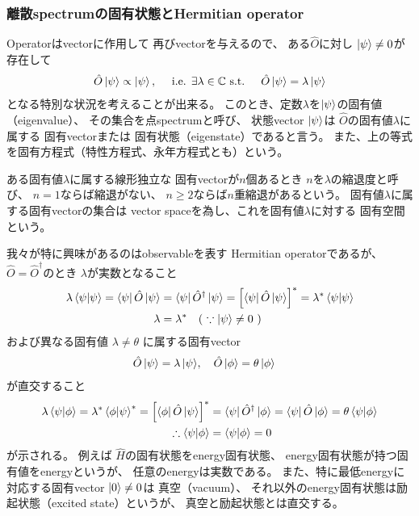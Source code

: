 \subsubsection{離散spectrumの固有状態とHermitian operator}

Operatorはvectorに作用して
再びvectorを与えるので、
ある$\hat{O}$に対し
$\ket{\psi} \neq 0$が存在して
\begin{align}
    \hat{O}\ket{\psi} \propto \ket{\psi}
,\quad\text{
    i.e.
    $\exists \lambda\in\mathbb{C}$
    s.t.
}\quad
    \hat{O}\ket{\psi} = \lambda \ket{\psi}
\end{align}
となる特別な状況を考えることが出来る。
このとき、定数$\lambda$を$\ket{\psi}$の固有値（eigenvalue）、
その集合を点spectrumと呼び、
状態vector $\ket{\psi}$は
$\hat{O}$の固有値$\lambda$に属する
固有vectorまたは
固有状態（eigenstate）であると言う。
また、上の等式を固有方程式（特性方程式、永年方程式とも）という。

ある固有値$\lambda$に属する線形独立な
固有vectorが$n$個あるとき
$n$を$\lambda$の縮退度と呼び、
$n = 1$ならば縮退がない、
$n \ge 2$ならば$n$重縮退があるという。
固有値$\lambda$に属する固有vectorの集合は
vector spaceを為し、これを固有値$\lambda$に対する
固有空間という。

我々が特に興味があるのはobservableを表す
Hermitian operatorであるが、
$\hat{O} = \hat{O}^\dagger$のとき
$\lambda$が実数となること
\begin{align}
    \lambda \braket{\psi | \psi}
    =
    \bra{\psi} \hat{O} \ket{\psi}
    &= \bra{\psi} \hat{O}^\dagger \ket{\psi}
    = \left[ \bra{\psi} \hat{O} \ket{\psi}\right]^*
    = \lambda^* \braket{\psi | \psi}
\notag\\
    \lambda &= \lambda^*
    \quad
    (\ 
        \because
        \ket{\psi} \neq 0
    \ 
    )
\end{align}
および異なる固有値
$\lambda \neq \theta$
に属する固有vector
\begin{align}
    \hat{O} \ket{\psi} = \lambda \ket{\psi}
&,\quad
    \hat{O} \ket{\phi} = \theta \ket{\phi}
\end{align}
が直交すること
\begin{align}
    \lambda
    \braket{\psi|\phi}
    =
    \lambda^*
    \braket{\phi|\psi}^*
    =
    \left[
        \bra{\phi} \hat{O} \ket{\psi}
    \right]^*
    &= \bra{\psi} \hat{O}^\dagger \ket{\phi}
    = \bra{\psi} \hat{O} \ket{\phi}
    = \theta \braket{\psi|\phi}
\\\therefore
    \braket{\psi|\phi}
    &=\braket{\psi|\phi}
    =0
\label{physically distinct states}
\end{align}
が示される。
例えば
$\hat{H}$の固有状態をenergy固有状態、
energy固有状態が持つ固有値をenergyというが、
任意のenergyは実数である。
また、特に最低energyに対応する固有vector
$\ket{0} \neq 0$は
真空（vacuum）、
それ以外のenergy固有状態は励起状態（excited state）というが、
真空と励起状態とは直交する。

